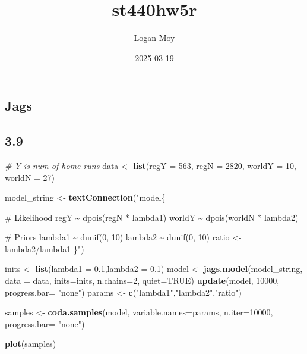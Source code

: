 \documentclass[
]{article}
\title{st440hw5r}
\author{Logan Moy}
\date{2025-03-19}
\newenvironment{Shaded}{\begin{snugshade}}{\end{snugshade}}
\newcommand{\AttributeTok}[1]{\textcolor[rgb]{0.13,0.29,0.53}{#1}}
\newcommand{\CommentTok}[1]{\textcolor[rgb]{0.56,0.35,0.01}{\textit{#1}}}
\newcommand{\ConstantTok}[1]{\textcolor[rgb]{0.56,0.35,0.01}{#1}}
\newcommand{\DecValTok}[1]{\textcolor[rgb]{0.00,0.00,0.81}{#1}}
\newcommand{\FloatTok}[1]{\textcolor[rgb]{0.00,0.00,0.81}{#1}}
\newcommand{\FunctionTok}[1]{\textcolor[rgb]{0.13,0.29,0.53}{\textbf{#1}}}
\newcommand{\NormalTok}[1]{#1}
\newcommand{\OtherTok}[1]{\textcolor[rgb]{0.56,0.35,0.01}{#1}}
\newcommand{\StringTok}[1]{\textcolor[rgb]{0.31,0.60,0.02}{#1}}
\begin{document}
\maketitle

\subsection{Jags}\label{jags}

\subsection{3.9}\label{section}

\begin{Shaded}
\begin{Highlighting}[]
  \CommentTok{\# Y is num of home runs}
\NormalTok{  data }\OtherTok{\textless{}{-}} \FunctionTok{list}\NormalTok{(}\AttributeTok{regY =} \DecValTok{563}\NormalTok{, }\AttributeTok{regN =} \DecValTok{2820}\NormalTok{, }\AttributeTok{worldY =} \DecValTok{10}\NormalTok{, }\AttributeTok{worldN =} \DecValTok{27}\NormalTok{)}

\NormalTok{  model\_string }\OtherTok{\textless{}{-}} \FunctionTok{textConnection}\NormalTok{(}\StringTok{"model\{}

\StringTok{   \# Likelihood}
\StringTok{    regY \textasciitilde{} dpois(regN * lambda1)}
\StringTok{    worldY \textasciitilde{} dpois(worldN * lambda2)}

\StringTok{   \# Priors}
\StringTok{    lambda1 \textasciitilde{}  dunif(0, 10)}
\StringTok{    lambda2 \textasciitilde{}  dunif(0, 10)}
\StringTok{    ratio \textless{}{-} lambda2/lambda1}
\StringTok{ \}"}\NormalTok{)}

\NormalTok{ inits }\OtherTok{\textless{}{-}} \FunctionTok{list}\NormalTok{(}\AttributeTok{lambda1 =} \FloatTok{0.1}\NormalTok{,}\AttributeTok{lambda2 =} \FloatTok{0.1}\NormalTok{)}
\NormalTok{ model }\OtherTok{\textless{}{-}} \FunctionTok{jags.model}\NormalTok{(model\_string, }\AttributeTok{data =}\NormalTok{ data, }\AttributeTok{inits=}\NormalTok{inits, }\AttributeTok{n.chains=}\DecValTok{2}\NormalTok{, }\AttributeTok{quiet=}\ConstantTok{TRUE}\NormalTok{)}
 \FunctionTok{update}\NormalTok{(model, }\DecValTok{10000}\NormalTok{, }\AttributeTok{progress.bar=} \StringTok{"none"}\NormalTok{)}
\NormalTok{ params  }\OtherTok{\textless{}{-}} \FunctionTok{c}\NormalTok{(}\StringTok{"lambda1"}\NormalTok{,}\StringTok{"lambda2"}\NormalTok{,}\StringTok{"ratio"}\NormalTok{)}
 
\NormalTok{ samples }\OtherTok{\textless{}{-}} \FunctionTok{coda.samples}\NormalTok{(model, }
            \AttributeTok{variable.names=}\NormalTok{params, }
            \AttributeTok{n.iter=}\DecValTok{10000}\NormalTok{, }\AttributeTok{progress.bar=} \StringTok{"none"}\NormalTok{)}

 
 \FunctionTok{plot}\NormalTok{(samples)}
\end{Highlighting}
\end{Shaded}
\end{document}
